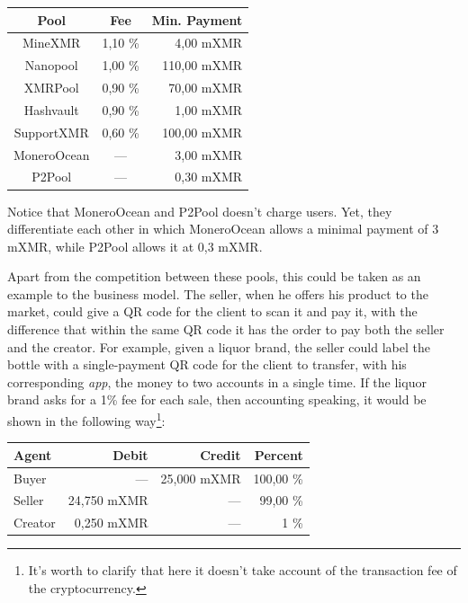 \documentclass[12pt,a4paper]{article}
\begin{document}
\begin{center}
\begin{tabular}{|c|c|r|}
\hline 
\textbf{Pool} & \textbf{Fee} & \textbf{Min. Payment} \\ 
\hline 
MineXMR & 1,10 \% & 4,00 mXMR \\ 
\hline 
Nanopool & 1,00 \% & 110,00 mXMR \\ 
\hline 
XMRPool & 0,90 \% & 70,00 mXMR \\ 
\hline 
Hashvault & 0,90 \% & 1,00 mXMR \\ 
\hline 
SupportXMR & 0,60 \% & 100,00 mXMR \\ 
\hline 
MoneroOcean & — & 3,00 mXMR \\ 
\hline 
P2Pool & — & 0,30 mXMR \\ 
\hline 
\end{tabular} 
\end{center}

Notice that MoneroOcean and P2Pool doesn't charge users. Yet, they differentiate each other in which MoneroOcean allows a minimal payment of 3 mXMR, while P2Pool allows it at 0,3 mXMR.

Apart from the competition between these pools, this could be taken as an example to the business model. The seller, when he offers his product to the market, could give a QR code for the client to scan it and pay it, with the difference that within the same QR code it has the order to pay both the seller and the creator. For example, given a liquor brand, the seller could label the bottle with a single-payment QR code for the client to transfer, with his corresponding \textit{app}, the money to two accounts in a single time. If the liquor brand asks for a 1\% fee for each sale, then accounting speaking, it would be shown in the following way\footnote{It's worth to clarify that here it doesn't take account of the transaction fee of the cryptocurrency.}:

\begin{center}
\begin{tabular}{|l|r|r|r|}
\hline 
\textbf{Agent} & \textbf{Debit} & \textbf{Credit} & \textbf{Percent} \\ 
\hline 
Buyer & — & 25,000 mXMR & 100,00 \% \\ 
\hline 
\hline
Seller & 24,750 mXMR & — & 99,00 \% \\
\hline 
Creator & 0,250 mXMR & — & 1 \% \\ 
\hline 
\end{tabular} 
\end{center}
\end{document}
